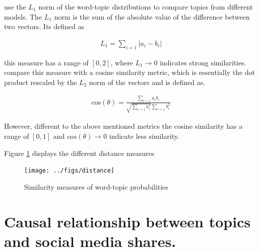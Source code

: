 \documentclass[12pt,a4paper,notitlepage]{article}
\begin{document}
{\citet{roberts_navigating_2016} use the $L_1$ norm of the word-topic distributions to compare topics from different models. The $L_1$ norm is the sum of the absolute value of the difference between two vectors. Its defined as

\begin{align*}
	L_1=\sum_{i=1} |a_i-b_i|
\end{align*}

this measure has a range of $[0,2]$, where $ L_1 \to 0$ indicates strong similarities. \citet{roberts_navigating_2016} compare this measure with a cosine similarity metric, which is essentially the dot product rescaled by the $L_2$ norm of the vectors and is defined as.

\begin{align*}
	\text{cos}(\theta)=\frac{\sum_{i=1}a_i b_i}{\sqrt{\sum_{i=1}a_i^2}\sum_{i=1}b_i^2}
\end{align*}

However, different to the above mentioned metrics the cosine similarity has a range of $[0,1]$ and $cos(\theta) \to 0$ indicate less similarity.

Figure \ref{fig_distance} displays the different distance measures 

\begin{figure}[H]
	\begin{center}
		\caption{Similarity measures of word-topic probabilities}
		\texttt{[image: ../figs/distance]}
		\label{fig_distance}
	\end{center}
\end{figure}


\section{Causal relationship between topics and social media shares.}\label{ch_regression}


}
\end{document}
